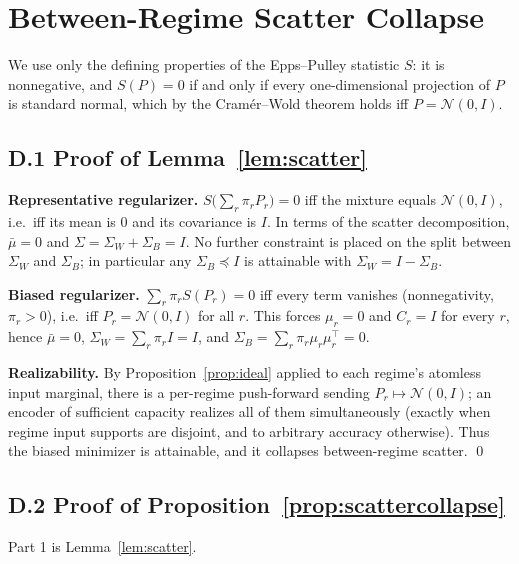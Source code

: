 \documentclass[10pt]{article}
\theoremstyle{remark}
\begin{document}
\section{Between-Regime Scatter Collapse}
\label{app:scatter}

We use only the defining properties of the Epps--Pulley statistic $S$: it is nonnegative, and $S(P) = 0$ if and only if every one-dimensional projection of $P$ is standard normal, which by the Cram\'er--Wold theorem holds iff $P = \mathcal{N}(0,I)$.

\subsection*{D.1 Proof of Lemma~\ref{lem:scatter}}

\textbf{Representative regularizer.} $S\bigl(\sum_r \pi_r P_r\bigr) = 0$ iff the mixture equals $\mathcal{N}(0,I)$, i.e.\ iff its mean is $0$ and its covariance is $I$. In terms of the scatter decomposition, $\bar{\mu} = 0$ and $\Sigma = \Sigma_W + \Sigma_B = I$. No further constraint is placed on the split between $\Sigma_W$ and $\Sigma_B$; in particular any $\Sigma_B \preceq I$ is attainable with $\Sigma_W = I - \Sigma_B$.

\textbf{Biased regularizer.} $\sum_r \pi_r S(P_r) = 0$ iff every term vanishes (nonnegativity, $\pi_r > 0$), i.e.\ iff $P_r = \mathcal{N}(0,I)$ for all $r$. This forces $\mu_r = 0$ and $C_r = I$ for every $r$, hence $\bar{\mu} = 0$, $\Sigma_W = \sum_r \pi_r I = I$, and $\Sigma_B = \sum_r \pi_r \mu_r \mu_r^\top = 0$.

\textbf{Realizability.} By Proposition~\ref{prop:ideal} applied to each regime's atomless input marginal, there is a per-regime push-forward sending $P_r \mapsto \mathcal{N}(0,I)$; an encoder of sufficient capacity realizes all of them simultaneously (exactly when regime input supports are disjoint, and to arbitrary accuracy otherwise). Thus the biased minimizer is attainable, and it collapses between-regime scatter. \qed

\subsection*{D.2 Proof of Proposition~\ref{prop:scattercollapse}}

Part 1 is Lemma~\ref{lem:scatter}.
\end{document}
